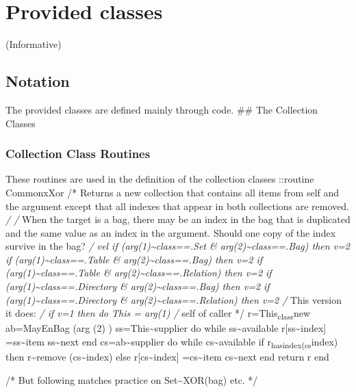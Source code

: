\hypertarget{provided-classes}{%
\chapter{Provided classes}\label{provided-classes}}

(Informative)

\hypertarget{notation}{%
\section{Notation}\label{notation}}

The provided classes are defined mainly through code. \#\# The
Collection Classes

\hypertarget{collection-class-routines}{%
\subsection{Collection Class Routines}\label{collection-class-routines}}

These routines are used in the definition of the collection classes
::routine CommonxXor /* Returns a new collection that contains all items
from self and the argument except that all indexes that appear in both
collections are removed. \emph{/ /} When the target is a bag, there may
be an index in the bag that is duplicated and the same value as an index
in the argument. Should one copy of the index survive in the bag?
\emph{/ vel if (arg(1)\textasciitilde class==.Set \&
arg(2)\textasciitilde class==.Bag) then v=2 if
(arg(1)\textasciitilde class==.Table \&
arg(2)\textasciitilde class==.Bag) then v=2 if
(arg(1)\textasciitilde class==.Table \&
arg(2)\textasciitilde class==.Relation) then v=2 if
(arg(1)\textasciitilde class==.Directory \&
arg(2)\textasciitilde class==.Bag) then v=2 if
(arg(1)\textasciitilde class==.Directory \&
arg(2)\textasciitilde class==.Relation) then v=2 /} This version it
does: \emph{/ if v=1 then do This = arg(1) /} self of caller */
r=This\textsubscript{class}new ab=MayEnBag (arg (2) )
ss=This\textasciitilde supplier do while ss\textasciitilde available
r{[}ss\textasciitilde index{]} =ss\textasciitilde item
ss\textasciitilde next end cs=ab\textasciitilde supplier do while
cs\textasciitilde available if r\textsubscript{hasindex(cs}index) then
r\textasciitilde remove (cs\textasciitilde index) else
r{[}cs\textasciitilde index{]} =cs\textasciitilde item
cs\textasciitilde next end return r end

/* But following matches practice on Set\textasciitilde XOR(bag) etc. */

